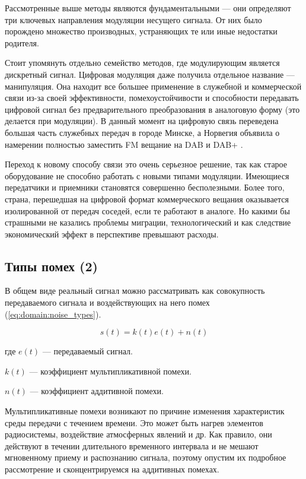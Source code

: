 Рассмотренные выше методы являются фундаментальными --- они определяют три ключевых направления модуляции несущего сигнала. От них было порождено множество производных, устраняющих те или иные недостатки родителя.

Стоит упомянуть отдельно семейство методов, где модулирующим является дискретный сигнал. Цифровая модуляция даже получила отдельное название --- манипуляция. Она находит все большее применение в служебной и коммерческой связи из-за своей эффективности, помехоустойчивости и способности передавать цифровой сигнал без предварительного преобразования в аналоговую форму (это делается при модуляции). В данный момент на цифровую связь переведена большая часть служебных передач в городе Минске, а Норвегия объявила о намерении полностью заместить FM вещание на DAB и DAB+ \cite{norway_dab}.

Переход к новому способу связи это очень серьезное решение, так как старое оборудование не способно работать с новыми типами модуляции. Имеющиеся передатчики и приемники становятся совершенно бесполезными. Более того, страна, перешедшая на цифровой формат коммерческого вещания оказывается изолированной от передач соседей, если те работают в аналоге. Но какими бы страшными не казались проблемы миграции, технологический и как следствие экономический эффект в перспективе превышают расходы.

\subsection{Типы помех (2)}

В общем виде реальный сигнал можно рассматривать как совокупность передаваемого сигнала и воздействующих на него помех (\autoref{eq:domain:noise_types}).

\begin{equation}
  \label{eq:domain:noise_types}
  s(t) = k(t) e(t) + n(t)
\end{equation}
\begin{explanation}
\item[где] $e(t)$ --- передаваемый сигнал.
\item $k(t)$ --- коэффициент мультипликативной помехи.
\item $n(t)$ --- коэффициент аддитивной помехи.
\end{explanation}

Мультипликативные помехи возникают по причине изменения характеристик среды передачи с течением времени. Это может быть нагрев элементов радиосистемы, воздействие атмосферных явлений и др. Как правило, они действуют в течении длительного временного интервала и не мешают мгновенному приему и распознанию сигнала, поэтому опустим их подробное рассмотрение и сконцентрируемся на аддитивных помехах.

